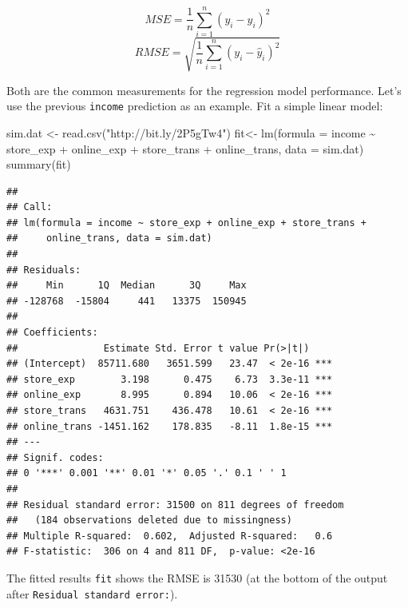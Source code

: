 \documentclass[
  12pt,
]{krantz}
\makeatletter
\newenvironment{Shaded}{\begin{snugshade}}{\end{snugshade}}
\newcommand{\AttributeTok}[1]{\textcolor[rgb]{0.61,0.61,0.61}{#1}}
\newcommand{\FunctionTok}[1]{\textcolor[rgb]{0,0,0}{#1}}
\newcommand{\NormalTok}[1]{#1}
\newcommand{\OtherTok}[1]{\textcolor[rgb]{0.37,0.37,0.37}{#1}}
\newcommand{\SpecialCharTok}[1]{\textcolor[rgb]{0,0,0}{#1}}
\newcommand{\StringTok}[1]{\textcolor[rgb]{0.5,0.5,0.5}{#1}}
\newenvironment{kframe}{%
\medskip{}
\setlength{\fboxsep}{.8em}
 \def\at@end@of@kframe{}%
 \ifinner\ifhmode%
  \def\at@end@of@kframe{\end{minipage}}%
  \begin{minipage}{\columnwidth}%
 \fi\fi%
 \def\FrameCommand##1{\hskip\@totalleftmargin \hskip-\fboxsep
 \colorbox{shadecolor}{##1}\hskip-\fboxsep
     \hskip-\linewidth \hskip-\@totalleftmargin \hskip\columnwidth}%
 \MakeFramed {\advance\hsize-\width
   \@totalleftmargin\z@ \linewidth\hsize
   \@setminipage}}%
 {\par\unskip\endMakeFramed%
 \at@end@of@kframe}
\renewenvironment{Shaded}{\begin{kframe}}{\end{kframe}}
\makeatother
\begin{document}
\[MSE=\frac{1}{n}\sum_{i=1}^{n}(y_{i}-\hat{y}_{i})^{2}\]
\[RMSE=\sqrt{\frac{1}{n}\sum_{i=1}^{n}(y_{i}-\hat{y}_{i})^{2}}\]

Both are the common measurements for the regression model performance. Let's use the previous \texttt{income} prediction as an example. Fit a simple linear model:

\begin{Shaded}
\begin{Highlighting}[]
\NormalTok{sim.dat }\OtherTok{\textless{}{-}} \FunctionTok{read.csv}\NormalTok{(}\StringTok{"http://bit.ly/2P5gTw4"}\NormalTok{)}
\NormalTok{fit}\OtherTok{\textless{}{-}} \FunctionTok{lm}\NormalTok{(}\AttributeTok{formula =}\NormalTok{ income }\SpecialCharTok{\textasciitilde{}}\NormalTok{ store\_exp }\SpecialCharTok{+}\NormalTok{ online\_exp }\SpecialCharTok{+}\NormalTok{ store\_trans }\SpecialCharTok{+} 
\NormalTok{    online\_trans, }\AttributeTok{data =}\NormalTok{ sim.dat)}
\FunctionTok{summary}\NormalTok{(fit)}
\end{Highlighting}
\end{Shaded}

\begin{verbatim}
## 
## Call:
## lm(formula = income ~ store_exp + online_exp + store_trans + 
##     online_trans, data = sim.dat)
## 
## Residuals:
##     Min      1Q  Median      3Q     Max 
## -128768  -15804     441   13375  150945 
## 
## Coefficients:
##               Estimate Std. Error t value Pr(>|t|)    
## (Intercept)  85711.680   3651.599   23.47  < 2e-16 ***
## store_exp        3.198      0.475    6.73  3.3e-11 ***
## online_exp       8.995      0.894   10.06  < 2e-16 ***
## store_trans   4631.751    436.478   10.61  < 2e-16 ***
## online_trans -1451.162    178.835   -8.11  1.8e-15 ***
## ---
## Signif. codes:  
## 0 '***' 0.001 '**' 0.01 '*' 0.05 '.' 0.1 ' ' 1
## 
## Residual standard error: 31500 on 811 degrees of freedom
##   (184 observations deleted due to missingness)
## Multiple R-squared:  0.602,  Adjusted R-squared:   0.6 
## F-statistic:  306 on 4 and 811 DF,  p-value: <2e-16
\end{verbatim}

The fitted results \texttt{fit} shows the RMSE is 31530 (at the bottom of the output after \texttt{Residual\ standard\ error:}).
\end{document}
